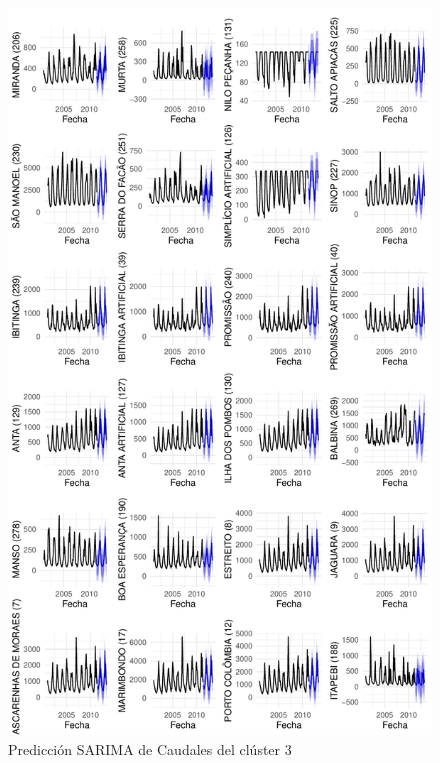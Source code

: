 \documentclass[12pt,oneside]{book}\usepackage[]{graphicx}\usepackage[]{color}
\makeatletter
\def\maxwidth{ %
  \ifdim\Gin@nat@width>\linewidth
    \linewidth
  \else
    \Gin@nat@width
  \fi
}
\newenvironment{knitrout}{}{} %
\theoremstyle{definition} %
\makeatother
\begin{document}
\begin{knitrout}
\color{fgcolor}\begin{figure}[h]

{\centering \includegraphics[width=\maxwidth,height=0.85\textheight]{figure/unnamed-chunk-89-1} 

}

\caption{\label{fig:pred_cl3_2} Predicción SARIMA de Caudales del clúster 3}\label{fig:unnamed-chunk-89}
\end{figure}


\end{knitrout}
\end{document}
